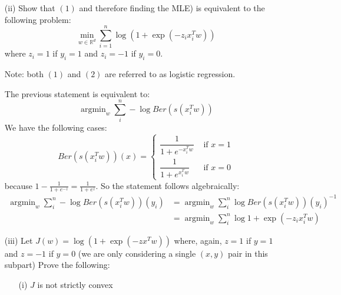 \documentclass{article}
\begin{document}
\begin{itemize}
\begin{itemize}
                \item [(ii)] Show that $(1)$ and therefore finding the MLE) is equivalent to the following problem:
                    \begin{equation*}
                        \min_{w \in \mathbb{R}^{d}} \sum_{i = 1}^{n} \log\left(1 + \exp(-z_{i} x_{i}^{T}w)\right)
                    \end{equation*}
                where $z_{i} = 1$ if $y_{i} = 1$ and $z_{i} = -1$ if $y_{i} = 0$.

                Note: both $(1)$ and $(2)$ are referred to as logistic regression.
                    \begin{answer}
                        The previous statement is equivalent to:
                            \begin{equation*}
                                \mathop{argmin}_{w} \sum_{i}^{n} - \log{Ber(s(x_{i}^{T}w))}
                            \end{equation*}
                        We have the following cases:
                            \begin{equation*}
                                Ber(s(x_{i}^{T}w))(x) = \begin{cases}
                                    \dfrac{1}{1 + e^{-x_{i}^{T}w}} &\text{ if } x = 1 \\
                                    \dfrac{1}{1 + e^{x_{i}^{T}w}} &\text{ if } x = 0                            
                                \end{cases}
                            \end{equation*}
                        because $1 - \frac{1}{1 + e^{-z}} = \frac{1}{1 + e^{z}}$. So the statement follows algebraically:
                            \begin{align*}
                                \mathop{argmin}_{w} \sum_{i}^{n} -\log{Ber(s(x_{i}^{T}w))(y_{i})} &= \mathop{argmin}_{w} \sum_{i}^{n} \log{Ber(s(x_{i}^{T}w))(y_{i})^{-1}} \\
                                                                                                  &= \mathop{argmin}_{w} \sum_{i}^{n} \log{ 1 + \exp(-z_{i}x_{i}^{T}w)}      
                            \end{align*}
                    \end{answer}

                \item [(iii)] Let $J(w) = \log(1 + \exp(-zx^{T}w))$ where, again, $z = 1$ if $y = 1$ and $z = -1$ if $y = 0$ (we are only considering a single $(x, y)$ pair in this subpart) Prove the following:
                    \begin{itemize}
                        \item [(i)] $J$ is not strictly convex


\end{itemize}
\end{itemize}
\end{itemize}
\end{document}

